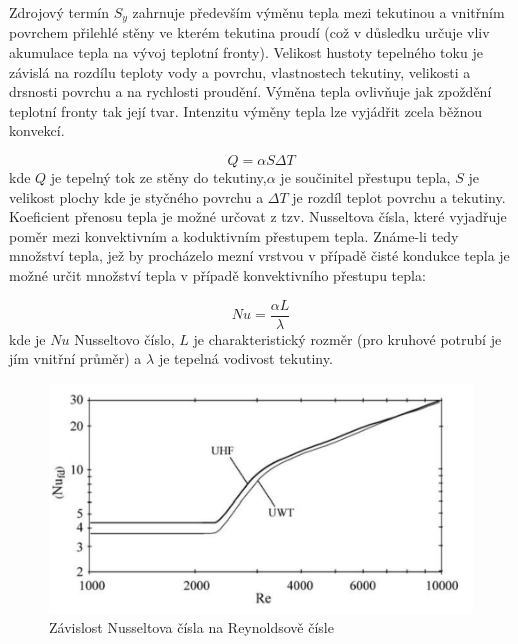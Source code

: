 Zdrojový termín \(S_y\) zahrnuje především výměnu tepla mezi tekutinou a 
vnitřním povrchem přilehlé stěny ve kterém tekutina proudí (což v důsledku 
určuje vliv akumulace tepla na vývoj teplotní fronty). Velikost hustoty 
tepelného toku je závislá na rozdílu teploty vody a povrchu, vlastnostech 
tekutiny, velikosti a drsnosti povrchu a na rychlosti proudění. Výměna tepla 
ovlivňuje jak zpoždění teplotní fronty tak její tvar. Intenzitu výměny tepla 
lze vyjádřit zcela běžnou konvekcí.

\begin{equation} 
Q = \alpha S \Delta T 
\end{equation}
kde \(Q\) je tepelný tok ze stěny do tekutiny,\(\alpha\) je součinitel přestupu
tepla, \(S\) je velikost plochy kde je styčného povrchu a \(\Delta T\) je 
rozdíl teplot povrchu a tekutiny. Koeficient přenosu tepla  je možné určovat z
tzv. Nusseltova čísla, které vyjadřuje poměr mezi konvektivním a koduktivním 
přestupem tepla. Známe-li tedy množství tepla, jež by procházelo mezní vrstvou 
v případě čisté kondukce tepla je možné určit množství tepla v případě 
konvektivního přestupu tepla:

\begin{equation} 
  \label{eq:ConvTransfer}
  Nu = \frac{\alpha L}{\lambda} 
\end{equation}
kde je \(Nu\) Nusseltovo číslo, \(L\) je charakteristický rozměr (pro kruhové 
potrubí je jím vnitřní průměr) a \(\lambda\) je tepelná vodivost tekutiny.

\begin{figure}[h] \centering \capstart
\includegraphics[scale=0.3]{figures/nusselt}
\caption{Závislost Nusseltova čísla na Reynoldsově čísle \cite{Abraham2009}}
\label{fig:NuReynolds}
\end{figure}

